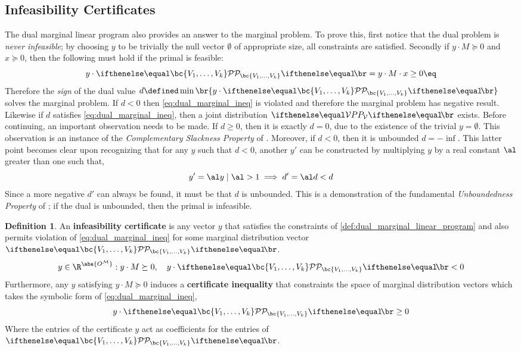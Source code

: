 \documentclass[aps, 10pt, english, twoside, pra, nofootinbib, longbibliography]{revtex4-1}
\theoremstyle{plain}
\theoremstyle{definition}
\newtheorem{definition}[theorem]{Definition}
\theoremstyle{remark}
\newcommand{\term}[1]{\textcolor{Mahogany}{\textbf{#1}}}
\begin{document}
    \subsection{Infeasibility Certificates}
    \label{sec:infeasibility_certificates}
    The dual marginal linear program also provides an answer to the marginal problem. To prove this, first notice that the dual problem is \textit{never infeasible}; by choosing $y$ to be trivially the null vector $\emptyset$ of appropriate size, all constraints are satisfied. Secondly if $y \cdot M \succeq 0$ and $x \succeq 0$, then the following must hold if the primal is feasible:
    \[ y \cdot \probvec[\bc{V_1, \ldots, V_k}] =  y \cdot M \cdot x \geq 0 \eq \label{eq:dual_marginal_ineq} \]
    Therefore the \textit{sign} of the dual value $d \defined \min \br{y \cdot \probvec[\bc{V_1, \ldots, V_k}]}$ solves the marginal problem. If $d < 0$ then \cref{eq:dual_marginal_ineq} is violated and therefore the marginal problem has negative result. Likewise if $d$ satisfies \cref{eq:dual_marginal_ineq}, then a joint distribution $\prob[\mathcal{V}]$ exists. Before continuing, an important observation needs to be made. If $d \geq 0$, then it is exactly $d = 0$, due to the existence of the trivial $y = \emptyset$. This observation is an instance of the \textit{Complementary Slackness Property} of \cite{Bradley_1977}.  Moreover, if $d < 0$, then it is unbounded $d = -\inf$. This latter point becomes clear upon recognizing that for any $y$ such that $d < 0$, another $y'$ can be constructed by multiplying $y$ by a real constant $\al$ greater than one such that,
    \[ y' = \al y \mid \al > 1 \implies d' = \al d < d \]
    Since a more negative $d'$ can always be found, it must be that $d$ is unbounded. This is a demonstration of the fundamental \textit{Unboundedness Property} of \cite{Bradley_1977}; if the dual is unbounded, then the primal is infeasible.


    \begin{definition} An \term{infeasibility certificate} is any vector $y$ that satisfies the constraints of \cref{def:dual_marginal_linear_program} and also permits violation of \cref{eq:dual_marginal_ineq} for some marginal distribution vector $\probvec[\bc{V_1, \ldots, V_k}]$.
    \[ y \in \R^{\abs{O^{\mathcal{M}}}} : y \cdot M \succeq 0, \quad y \cdot \probvec[\bc{V_1, \ldots, V_k}] < 0 \]
    Furthermore, any $y$ satisfying $y \cdot M \succeq 0$ induces a \term{certificate inequality} that constraints the space of marginal distribution vectors which takes the symbolic form of \cref{eq:dual_marginal_ineq},
    \[ y \cdot \probvec[\bc{V_1, \ldots, V_k}] \geq 0 \]
    Where the entries of the certificate $y$ act as coefficients for the entries of $\probvec[\bc{V_1, \ldots, V_k}]$.
    \end{definition}
\end{document}
